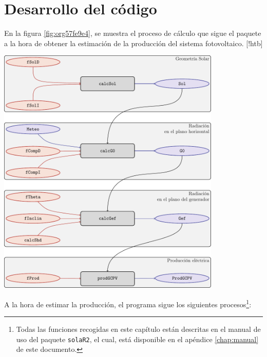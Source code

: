 \chapter{Desarrollo del código}
\label{chap:desarrollo-codigo}
\makeatletter
\renewenvironment{figure}[1][H]{%
     	\@float{figure}[#1]%
		\precaption{\rule{\linewidth}{0.4pt}\par}%
		\centering
		  }{%
    	\end@float	
}
\makeatother

En la figura \ref{fig:org57fe9e4}, se muestra el proceso de cálculo que sigue el paquete a la hora de obtener la estimación de la producción del sistema fotovoltaico.
\begin{figure}[!htb]
\centering
\includegraphics[keepaspectratio,width=0.8\textwidth,height=0.43\textheight]{figuras/procedure.pdf}
\caption{\label{fig:org57fe9e4}Proceso de cálculo de las funciones de \texttt{solaR2}}
\end{figure}
A la hora de estimar la producción, el programa sigue los siguientes procesos\footnote{Todas las funciones recogidas en este capítulo están descritas en el manual de uso del paquete \texttt{solaR2}, el cual, está disponible en el apéndice \ref{chap:manual} de este documento.}:
